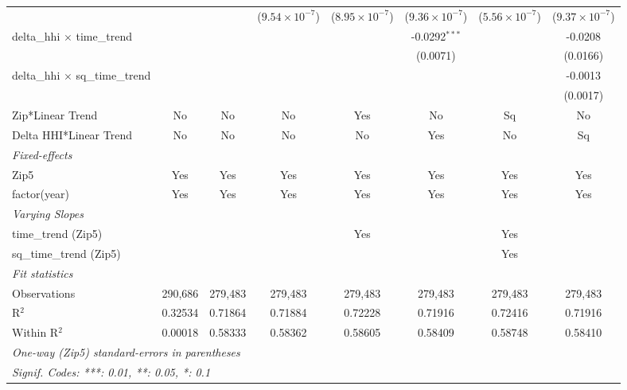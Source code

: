 \begin{table}[H]
{\begin{tabular}{lccccccc}
   &   &    & ($9.54\times 10^{-7}$) & ($8.95\times 10^{-7}$) & ($9.36\times 10^{-7}$) & ($5.56\times 10^{-7}$) & ($9.37\times 10^{-7}$)\\ 

 delta\_hhi $\times $ time\_trend&   &    &    &    & -0.0292$^{***}$ &    & -0.0208\\ 

   &   &    &    &    & (0.0071) &    & (0.0166)\\ 

 delta\_hhi $\times $ sq\_time\_trend&   &    &    &    &    &    & -0.0013\\ 

   &   &    &    &    &    &    & (0.0017)\\ 

 Zip*Linear Trend & No & No & No & Yes & No & Sq & No\\ 

 Delta HHI*Linear Trend & No & No & No & No & Yes & No & Sq\\ 

 \midrule \emph{Fixed-effects}&   &   &   &   &   &   &  \\ 

 Zip5 & Yes & Yes & Yes & Yes & Yes & Yes & Yes\\ 

 factor(year) & Yes & Yes & Yes & Yes & Yes & Yes & Yes\\ 

 \midrule \emph{Varying Slopes}&   &   &   &   &   &   &  \\ 

 time\_trend (Zip5) &  &  &  & Yes &  & Yes & \\ 

 sq\_time\_trend (Zip5) &  &  &  &  &  & Yes & \\ 

 \midrule \emph{Fit statistics}&  & & & & & & \\ 

 Observations & 290,686&279,483&279,483&279,483&279,483&279,483&279,483\\ 

 R$^2$ & 0.32534&0.71864&0.71884&0.72228&0.71916&0.72416&0.71916\\ 

 Within R$^2$ & 0.00018&0.58333&0.58362&0.58605&0.58409&0.58748&0.58410\\ 

 \midrule\midrule\multicolumn{8}{l}{\emph{One-way (Zip5) standard-errors in parentheses}}\\ 

 \multicolumn{8}{l}{\emph{Signif. Codes: ***: 0.01, **: 0.05, *: 0.1}}\\ 

 \end{tabular}} 

 \end{table} 

